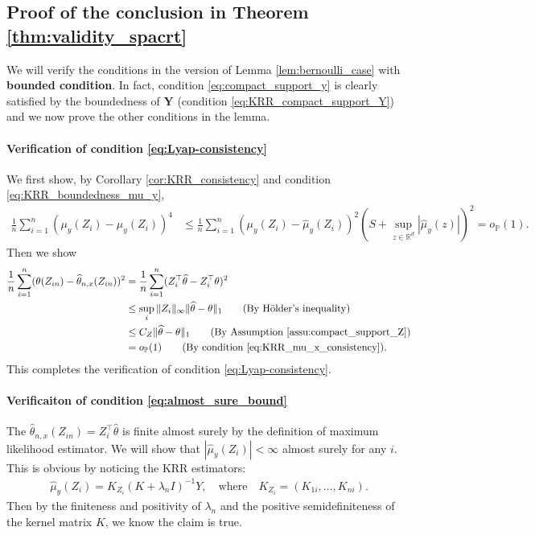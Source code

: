 \documentclass[12pt]{article}
\theoremstyle{definition}
\def\P{\mathbb{P}}
\def\P{\mathbb{P}}
\renewcommand{\P}{\mathbb{P}}							%
\newcommand{\srz}{Z}									%
\newcommand{\pry}{{\bm Y}}								%
\begin{document}
\subsection{Proof of the conclusion in Theorem \ref{thm:validity_spacrt}}\label{sec:KRR_proof_approximation_accuracy}

We will verify the conditions in the version of Lemma \ref{lem:bernoulli_case} with \textbf{bounded condition}. In fact, condition \eqref{eq:compact_support_y} is clearly satisfied by the boundedness of $\pry$ (condition \eqref{eq:KRR_compact_support_Y}) and we now prove the other conditions in the lemma.

\paragraph{Verification of condition \eqref{eq:Lyap-consistency}}

We first show, by Corollary \ref{cor:KRR_consistency} and condition \eqref{eq:KRR_boundedness_mu_y},
\begin{align*}
  \frac{1}{n}\sum_{i=1}^n (\mu_{y}(\srz_i)-\widehat{\mu}_y(\srz_i))^4
  &
  \leq \frac{1}{n}\sum_{i=1}^n(\mu_{y}(\srz_i)-\widehat{\mu}_y(\srz_i))^2(S+\sup_{z\in\mathbb{R}^d}|\widehat{\mu}_y(z)|)^2=o_\P(1).
\end{align*}
Then we show
\begin{align*}
  \frac{1}{n}\sum_{i=1}^n (\theta(\srz_{in})-\widehat{\theta}_{n,x}(\srz_{in}))^2
  &
  =\frac{1}{n}\sum_{i=1}^n (\srz_i^\top\widehat{\theta}-\srz_i^\top\theta)^2\\
  &
  \leq \sup_i\|\srz_i\|_{\infty}\|\widehat{\theta}-\theta\|_1\tag{By H\"older's inequality}\\
  &
  \leq C_Z\|\widehat{\theta}-\theta\|_1\tag{By Assumption \ref{assu:compact_support_Z}}\\
  &
  =o_\P(1)\tag{By condition \eqref{eq:KRR_mu_x_consistency}}.
\end{align*}
This completes the verification of condition \eqref{eq:Lyap-consistency}.


\paragraph{Verificaiton of condition \eqref{eq:almost_sure_bound}}

The $\widehat{\theta}_{n,x}(\srz_{in})=\srz_i^\top\widehat{\theta}$ is finite almost surely by the definition of maximum likelihood estimator. We will show that $|\widehat{\mu}_{y}(\srz_i)|<\infty$ almost surely for any $i$. This is obvious by noticing the KRR estimators:
\begin{align*}
  \widehat{\mu}_{y}(\srz_i)=K_{\srz_i}(K+\lambda_n I)^{-1}Y,\quad\text{where}\quad K_{Z_i}=(K_{1i},\ldots,K_{ni}).
\end{align*}
Then by the finiteness and positivity of $\lambda_n$ and the positive semidefiniteness of the kernel matrix $K$, we know the claim is true.
\end{document}
